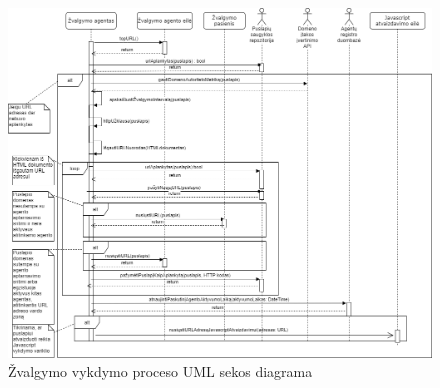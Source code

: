 \begin{figure}[ht!]
\hspace*{-2cm} 
\centering
\includegraphics[scale=0.5]{img/perform_cralwing_sequence.png}
\caption{Žvalgymo vykdymo proceso UML sekos diagrama}
\label{fig:perform_crawling_uml_sequence}
\end{figure}